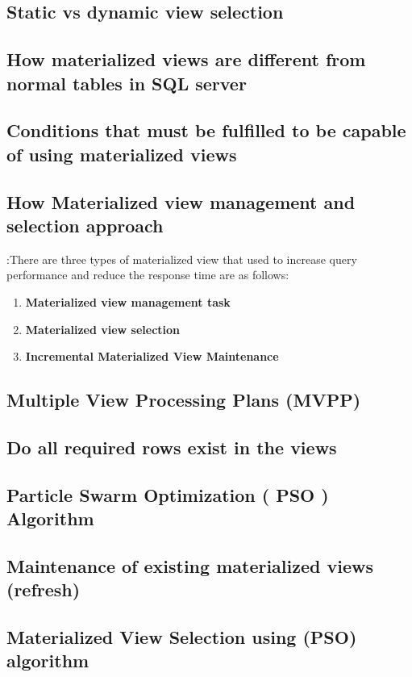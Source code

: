 \subsection{ Static vs dynamic view selection }
\subsection{How  materialized views are different from normal tables in  SQL server }
\subsection{Conditions that must be fulfilled to be capable of using materialized views }

\subsection{ How Materialized view management and selection approach} :There are three types of materialized view that used to increase query performance and reduce the response time are as follows:

\begin{enumerate}[label=\alph*)]
    \item \textbf{Materialized view management task}
    \item \textbf{Materialized view selection}
    \item \textbf{Incremental Materialized View Maintenance}
\end{enumerate}

\subsection{Multiple View Processing Plans (MVPP) }
\subsection{Do all required rows exist in the views }
\subsection{Particle Swarm Optimization ( PSO ) Algorithm
 }
\subsection{Maintenance of existing materialized views (refresh)
}
\subsection{Materialized View Selection using (PSO) algorithm }
